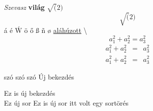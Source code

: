 \documentclass[]{article}
\begin{document}
\textit{Szevasz} \textbf{világ} $\sqrt(2)$
 $$\sqrt(2)$$
 \'a \'e \'W
 \"o
 \H{o}
 \ss
 \~n
 \o
 \underline{aláhúzott}
\textbackslash
\begin{equation}
	a_1^2+a_2^2=a_3^2
\end{equation}
\begin{eqnarray}
	a_1^2+a_2^2&=&a_3^2\\
	a_1^2+a_2^2&=&a_3^2
\end{eqnarray}
\iffalse
Ez a rész egy komment
és többsoros.
\fi
\begin{flushleft}
	\blindtext
\end{flushleft}
\begin{center}
	\blindtext
\end{center}
szó  szó                    szó
Új bekezdés \par
Ez is új bekezdés\\
Ez új sor \newline
Ez is új sor \linebreak
itt volt egy sortörés
\end{document}
